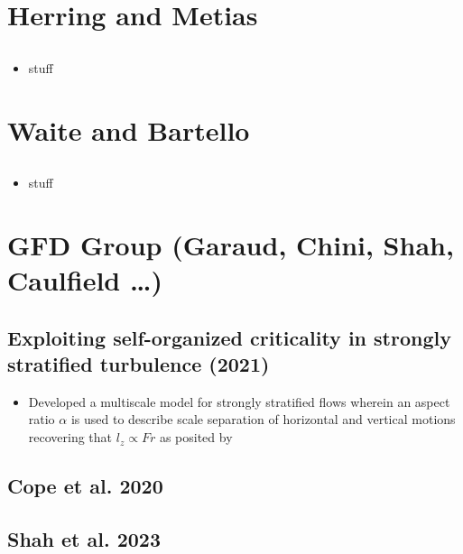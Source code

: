 \documentclass{article}
\begin{document}
\section{Herring and Metias}
    \subsection{}
    \begin{itemize}
        \item stuff
    \end{itemize}

\section{Waite and Bartello}
    \subsection{}
    \begin{itemize}
        \item stuff
    \end{itemize}


\section{GFD Group (Garaud, Chini, Shah, Caulfield \ldots)}
    \subsection{Exploiting self-organized criticality in strongly stratified
    turbulence (2021)}
    \begin{itemize}
        \item Developed a multiscale model for strongly stratified flows wherein an
        aspect ratio $\alpha$ is used to describe scale separation of horizontal and
        vertical motions recovering that $l_z \propto Fr$ as posited by
    \end{itemize}

    \subsection{Cope et al. 2020}

    \subsection{Shah et al. 2023}
\end{document}
